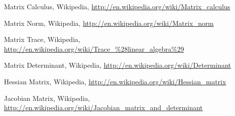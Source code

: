	Matrix Calculus, Wikipedia, 
	\url{http://en.wikipedia.org/wiki/Matrix_calculus}
	
	Matrix Norm, Wikipedia, 
	\url{http://en.wikipedia.org/wiki/Matrix_norm}
	
	Matrix Trace, Wikipedia, 
	\url{http://en.wikipedia.org/wiki/Trace_%28linear_algebra%29}
	
	Matrix Determinant, Wikipedia, 
	\url{http://en.wikipedia.org/wiki/Determinant}
	
	Hessian Matrix, Wikipedia, 
	\url{http://en.wikipedia.org/wiki/Hessian_matrix}
	
	Jacobian Matrix, Wikipedia, 
	\url{http://en.wikipedia.org/wiki/Jacobian_matrix_and_determinant}